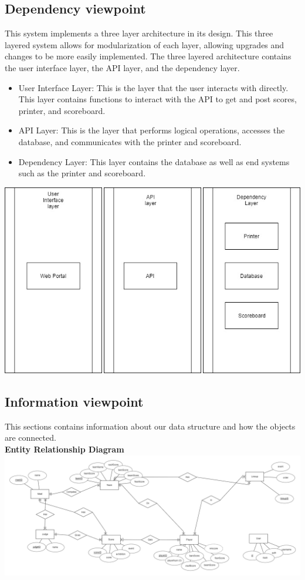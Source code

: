 \documentclass[letterpaper,10pt,draftclsnofoot,onecolumn,]{article}
\begin{document}
\subsection{Dependency viewpoint}
This system implements a three layer architecture in its design. This three layered system allows for modularization of each layer, allowing upgrades and changes to be more easily implemented.\newline
The three layered architecture contains the user interface layer, the API layer, and the dependency layer.
\begin{itemize}
    \item User Interface Layer: This is the layer that the user interacts with directly. This layer contains functions to interact with the API to get and post scores, printer, and scoreboard.
    \item API Layer: This is the layer that performs logical operations, accesses the database, and communicates with the printer and scoreboard.
    \item Dependency Layer: This layer contains the database as well as end systems such as the printer and scoreboard.
\end{itemize}
\includegraphics[width=\textwidth,height=\textheight,keepaspectratio]{dependencydiagram}
\subsection{Information viewpoint}
This sections contains information about our data structure and how the objects are connected.\\ \newline
\textbf{Entity Relationship Diagram} \\ \newline
\includegraphics[width=\textwidth,height=\textheight,keepaspectratio]{gymnasticsDB.png}
\end{document}
